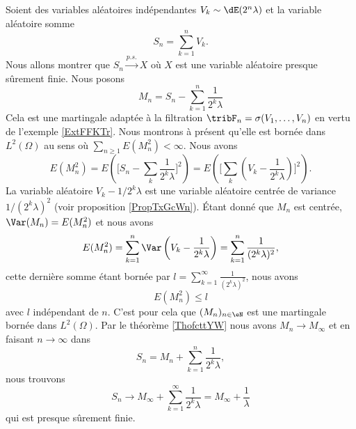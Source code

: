 \begin{example}
    Soient des variables aléatoires indépendantes \( V_k\sim\dE(2^n\lambda)\) et la variable aléatoire somme
    \begin{equation}
        S_n=\sum_{k=1}^nV_k.
    \end{equation}
    Nous allons montrer que \( S_n\stackrel{p.s.}{\longrightarrow}X\) où \( X\) est une variable aléatoire presque sûrement finie. Nous posons
    \begin{equation}
        M_n=S_n-\sum_{k=1}^n\frac{1}{ 2^k\lambda }
    \end{equation}
    Cela est une martingale adaptée à la filtration \( \tribF_n=\sigma(V_1,\ldots, V_n)\) en vertu de l'exemple \ref{ExtFFKTr}. Nous montrons à présent qu'elle est bornée dans \( L^2(\Omega)\) au sens où \( \sum_{n\geq 1}E(M_n^2)<\infty\). Nous avons
    \begin{equation}
        E(M_n^2)=E\left( \big[ S_n-\sum_k\frac{1}{ 2^k\lambda } \big]^2 \right)=E\left( \big[ \sum_k(V_k-\frac{1}{ 2^k\lambda }) \big]^2 \right).
    \end{equation}
    La variable aléatoire \( V_k-1/2^k\lambda\) est une variable aléatoire centrée de variance \( 1/(2^k\lambda)^2\) (voir proposition \ref{PropTxGcWn}). Étant donné que \( M_n\) est centrée, \( \Var(M_n)=E(M_n^2)\) et nous avons
    \begin{equation}
        E(M_n^2)=\sum_{k=1}^n\Var\left( V_k-\frac{1}{ 2^k\lambda } \right)=\sum_{k=1}^n\frac{1}{ (2^k\lambda)^2 },
    \end{equation}
    cette dernière somme étant bornée par \( l=\sum_{k=1}^{\infty}\frac{1}{ (2^k\lambda)^2 }\), nous avons
    \begin{equation}
        E(M_n^2)\leq l
    \end{equation}
    avec \( l\) indépendant de \( n\). C'est pour cela que \( (M_n)_{n\in \eN}\) est une martingale bornée dans \( L^2(\Omega)\). Par le théorème \ref{ThofcttYW} nous avons \( M_n\to M_{\infty}\) et en faisant \( n\to \infty\) dans
    \begin{equation}
        S_n=M_n+\sum_{k=1}^n\frac{1}{ 2^k\lambda },
    \end{equation}
    nous trouvons
    \begin{equation}
        S_n\to M_{\infty}+\sum_{k=1}^{\infty}\frac{1}{ 2^k\lambda }=M_{\infty}+\frac{1}{ \lambda }
    \end{equation}
    qui est presque sûrement finie.
\end{example}

